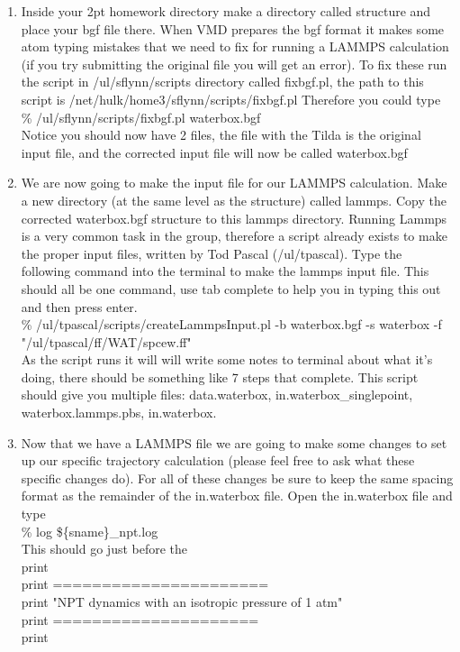 \documentclass{article}
\begin{document}
\begin{enumerate}
\item Inside your 2pt homework directory make a directory called structure and place your bgf file there.
When VMD prepares the bgf format it makes some atom typing mistakes that we need to fix for running a LAMMPS calculation (if you try submitting the original file you will get an error). 
To fix these run the script in /ul/sflynn/scripts directory called fixbgf.pl, the path to this script is /net/hulk/home3/sflynn/scripts/fixbgf.pl
Therefore you could type \\
\% /ul/sflynn/scripts/fixbgf.pl waterbox.bgf
\\
Notice you should now have 2 files, the file with the Tilda is the original input file, and the corrected input file will now be called waterbox.bgf\\

\item We are now going to make the input file for our LAMMPS calculation. 
Make a new directory (at the same level as the structure) called lammps.
Copy the corrected waterbox.bgf structure to this lammps directory.
Running Lammps is a very common task in the group, therefore a script already exists to make the proper input files, written by Tod Pascal (/ul/tpascal).
Type the following command into the terminal to make the lammps input file.
This should all be one command, use tab complete to help you in typing this out and then press enter. \\

\% /ul/tpascal/scripts/createLammpsInput.pl -b waterbox.bgf -s waterbox -f "/ul/tpascal/ff/WAT/spcew.ff"\\

As the script runs it will will write some notes to terminal about what it's doing, there should be something like 7 steps that complete. 
This script should give you multiple files: data.waterbox, in.waterbox\_singlepoint, waterbox.lammps.pbs, in.waterbox.\\

\item Now that we have a LAMMPS file we are going to make some changes to set up our specific trajectory calculation (please feel free to ask what these specific changes do).
For all of these changes be sure to keep the same spacing format as the remainder of the in.waterbox file. 
Open the in.waterbox file and type\\
\% log \hspace{10mm}  \$\{sname\}\_npt.log\\
This should go just before the \\
print \\
print ======================\\
print "NPT dynamics with an isotropic pressure of 1 atm"\\
print =====================\\
print\\


\end{enumerate}
\end{document}

